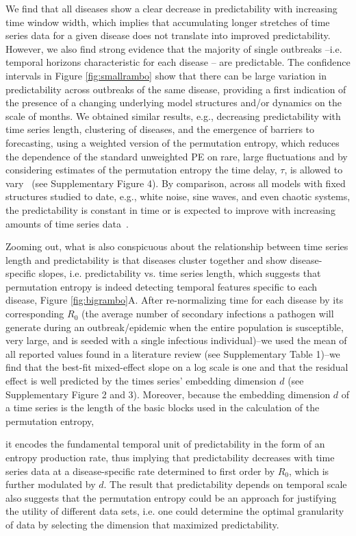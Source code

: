 \documentclass[fleqn,12pt]{wlscirep}
\begin{document}
We find that all diseases show a clear decrease in predictability with increasing time window width, which implies that accumulating longer stretches of time series data for a given disease does not translate into improved predictability.  However, we also find strong evidence that the majority of single outbreaks --i.e. temporal horizons characteristic for each disease -- are predictable.  The confidence intervals in Figure \ref{fig:smallrambo} show that there can be large variation in predictability across outbreaks of the same disease, providing a first indication of the presence of a changing underlying model structures and\slash or dynamics on the scale of months. We obtained similar results, e.g., decreasing predictability with time series length, clustering of diseases, and the emergence of barriers to forecasting,  using a weighted version of the permutation entropy, which reduces the dependence of the standard unweighted PE on rare, large fluctuations and by considering estimates of the permutation entropy the time delay, $\tau$, is allowed to vary~\cite{fadlallah2013weighted,garland2014model} (see Supplementary Figure 4). By comparison, across all models with fixed structures studied to date, e.g., white noise, sine waves, and even chaotic systems, the predictability is constant in time or is expected to improve with increasing amounts of time series data~\cite{farmer1987predicting}.

Zooming out, what is also conspicuous about the relationship between time series length and predictability is that diseases cluster together and show disease-specific slopes, i.e. predictability vs. time series length, which suggests that permutation entropy is indeed detecting temporal features specific to each disease, Figure \ref{fig:bigrambo}A. After re-normalizing time for each disease by its corresponding $R_0$ (the average number of secondary infections a pathogen will generate during an outbreak\slash epidemic when the entire population is susceptible, very large, and is seeded with a single infectious individual)--we used the mean of all reported values found in a literature review (see Supplementary Table 1)--we find that the best-fit mixed-effect slope on a log scale is one and that the residual effect is well predicted by the times series' embedding dimension $d$ (see Supplementary Figure 2 and 3).  Moreover, because the embedding dimension $d$ of a time series is the length of the basic blocks used in the calculation of the permutation entropy, 

\noindent it encodes the fundamental temporal unit of predictability in the form of an entropy production rate, thus implying that predictability decreases with time series data at a disease-specific rate determined to first order by $R_0$, which is further modulated by $d$.  
The result that predictability depends on temporal scale also suggests that the permutation entropy could be an approach for justifying the utility of different data sets, i.e. one could determine the optimal granularity of data by selecting the dimension that maximized predictability. 
\end{document}
